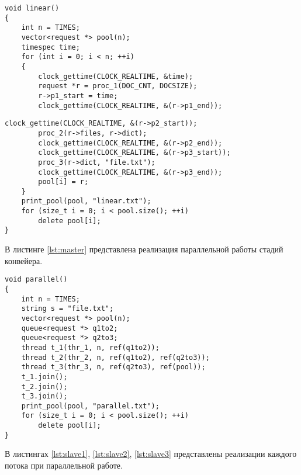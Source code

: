\begin{center}
	\captionsetup{justification=raggedright,singlelinecheck=off}
	\begin{lstlisting}[label=lst:seq,caption=Последовательная работа стадий конвейера]
void linear()
{
	int n = TIMES;
	vector<request *> pool(n);
	timespec time;
	for (int i = 0; i < n; ++i)
	{
		clock_gettime(CLOCK_REALTIME, &time);
		request *r = proc_1(DOC_CNT, DOCSIZE);
		r->p1_start = time;
		clock_gettime(CLOCK_REALTIME, &(r->p1_end));
	\end{lstlisting}
\pagebreak
\begin{lstlisting}[label=lst:seq2,caption=Последовательная работа стадий конвейера (окончание)]
		clock_gettime(CLOCK_REALTIME, &(r->p2_start));
		proc_2(r->files, r->dict);
		clock_gettime(CLOCK_REALTIME, &(r->p2_end));
		clock_gettime(CLOCK_REALTIME, &(r->p3_start));
		proc_3(r->dict, "file.txt");
		clock_gettime(CLOCK_REALTIME, &(r->p3_end));
		pool[i] = r;
	}
	print_pool(pool, "linear.txt");
	for (size_t i = 0; i < pool.size(); ++i)
		delete pool[i];
}
	\end{lstlisting}
\end{center}
В листинге \ref{lst:master} представлена реализация параллельной работы стадий конвейера.
\begin{center}
	\captionsetup{justification=raggedright,singlelinecheck=off}
	\begin{lstlisting}[label=lst:master,caption=Параллельная работа стадий конвейера]
void parallel()
{
	int n = TIMES;
	string s = "file.txt";
	vector<request *> pool(n);
	queue<request *> q1to2;
	queue<request *> q2to3;
	thread t_1(thr_1, n, ref(q1to2));
	thread t_2(thr_2, n, ref(q1to2), ref(q2to3));
	thread t_3(thr_3, n, ref(q2to3), ref(pool));
	t_1.join();
	t_2.join();
	t_3.join();
	print_pool(pool, "parallel.txt");
	for (size_t i = 0; i < pool.size(); ++i)
		delete pool[i];
}
	\end{lstlisting}
\end{center}
\clearpage
В листингах \ref{lst:slave1}, \ref{lst:slave2}, \ref{lst:slave3} представлены реализации каждого потока при параллельной работе.
